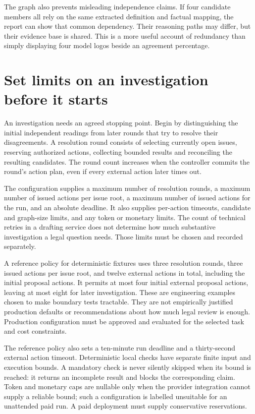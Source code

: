 \documentclass[12pt,a4paper,oneside,openany]{book}
\begin{document}
The graph also prevents misleading independence claims. If four candidate members
all rely on the same extracted definition and factual mapping, the report can
show that common dependency. Their reasoning paths may differ, but their evidence
base is shared. This is a more useful account of redundancy than simply displaying
four model logos beside an agreement percentage.

\section{Set limits on an investigation before it starts}
\label{merge:M06:12}


An investigation needs an agreed stopping point. Begin by distinguishing the
initial independent readings from later rounds that try to resolve their
disagreements. A resolution round consists of selecting currently open
issues, reserving authorized actions, collecting bounded results and reconciling
the resulting candidates. The round count increases when the controller commits
the round's action plan, even if every external action later times out.

The configuration supplies a maximum number of resolution rounds, a maximum
number of issued actions per issue root, a maximum number of issued actions for
the run, and an absolute deadline. It also supplies per-action timeouts, candidate
and graph-size limits, and any token or monetary limits. The count of technical retries in a drafting service does not determine how
much substantive investigation a legal question needs. Those limits must be
chosen and recorded separately.

A reference policy for deterministic fixtures uses three resolution rounds,
three issued actions per issue root, and twelve external actions in total,
including the initial proposal actions. It permits at most four initial external
proposal actions, leaving at most eight for later investigation. These are
engineering examples chosen to make boundary tests tractable. They are not
empirically justified production defaults or recommendations about how much
legal review is enough. Production configuration must be approved and evaluated
for the selected task and cost constraints.

The reference policy also sets a ten-minute run deadline and a thirty-second
external action timeout. Deterministic local checks have separate finite input
and execution bounds. A mandatory check is never silently skipped when its bound
is reached: it returns an incomplete result and blocks the corresponding claim.
Token and monetary caps are nullable only when the provider integration cannot
supply a reliable bound; such a configuration is labelled unsuitable for an
unattended paid run. A paid deployment must supply conservative reservations.
\end{document}
